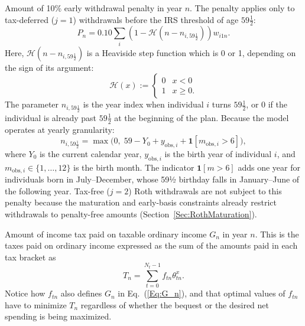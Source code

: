 \documentclass[fleqn,12pt]{report}
\begin{document}
\begin{description}[leftmargin=4em,style=multiline]
\item [$P_n$]
	Amount of 10\% early withdrawal penalty in year $n$.
	The penalty applies only to tax-deferred ($j=1$) withdrawals before the IRS threshold of age $59\frac{1}{2}$:
	\begin{equation}
		\label{Eq:PenTax0}
		P_n = 0.10 \sum_i (1 - \mathcal{H}(n - n_{i,59\frac{1}{2}})) w_{i1n}.
	\end{equation}
        Here, $\mathcal{H}(n - n_{i,59\frac{1}{2}})$ is a Heaviside step function which is 0 or 1,
 depending on the sign of its argument:
	\begin{equation}
	\mathcal{H}(x) :=
	\begin{cases}
         0 & x < 0 \\
         1 & x \geq 0.
	\end{cases}
	\end{equation}
        The parameter $n_{i,59\frac{1}{2}}$ is the year index when individual $i$ turns $59\frac{1}{2}$,
	or 0 if the individual is already past $59\frac{1}{2}$ at the beginning of the plan.
	Because the model operates at yearly granularity:
	\begin{equation}
		n_{i,59\frac{1}{2}} = \max\bigl(0,\; 59 - Y_0 + y_{\mathrm{obs},i}
		             + \mathbf{1}[m_{\mathrm{obs},i} > 6]\bigr),
	\end{equation}
	where $Y_0$ is the current calendar year, $y_{\mathrm{obs},i}$ is the birth year of
	individual $i$, and $m_{\mathrm{obs},i} \in \{1,\ldots,12\}$ is the birth month.
	The indicator $\mathbf{1}[m>6]$ adds one year for individuals born
	in July--December, whose 59½ birthday falls in January--June of the following year.
	Tax-free ($j=2$) Roth withdrawals are not subject to this penalty because
	the maturation and early-basis constraints already restrict withdrawals to penalty-free
	amounts (Section~\ref{Sec:RothMaturation}).

\item [$T_n$]
	Amount of income tax paid on taxable ordinary income $G_n$ in year $n$.
	This is the taxes paid on ordinary income expressed as the sum of the amounts
	paid in each tax bracket as
	\begin{equation}
		\label{Eq:IncTax1}
		T_n = \sum_{t=0}^{N_t-1} f_{tn}\theta^x_{tn}.
	\end{equation}
	Notice how $f_{tn}$ also defines $G_n$ in Eq.~(\ref{Eq:G_n}), and that optimal
	values of $f_{tn}$ have to minimize $T_n$ regardless of whether the bequest or the desired
	net spending is being maximized.


\end{description}
\end{document}
